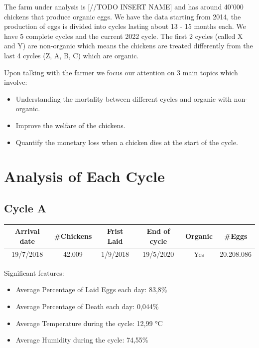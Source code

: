 \documentclass[11pt]{article}
\begin{document}
The farm under analysis is [//TODO INSERT NAME] and has around 40'000 chickens that produce organic eggs. We have the data starting from 2014, the production of eggs is divided into cycles lasting about 13 - 15 months each. We have 5 complete cycles and the current 2022 cycle. The first 2 cycles (called X and Y) are non-organic which means the chickens are treated differently from the last 4 cycles (Z, A, B, C) which are organic.

Upon talking with the farmer we focus our attention on 3 main topics which involve:
\begin{itemize}
    \item Understanding the mortality between different cycles and organic with non-organic.
    \item Improve the welfare of the chickens.
    \item Quantify the monetary loss when a chicken dies at the start of the cycle.
\end{itemize}

\section{Analysis of Each Cycle}
\subsection{Cycle A}
\begin{center}
    \begin{tabular}{|c | c | c | c | c | c|} 
        \hline
        \textbf{Arrival date} & \textbf{\#Chickens} & \textbf{Frist Laid} & \textbf{End of cycle} & \textbf{Organic} & \textbf{\#Eggs}\\ [0.5ex] 
        \hline
        19/7/2018 & 42.009 & 1/9/2018 & 19/5/2020 & Yes & 20.208.086\\
        \hline
    \end{tabular}
\end{center}
Significant features:
\begin{itemize}
    \item Average Percentage of Laid Eggs each day: 83,8\%
    \item Average Percentage of Death each day: 0,044\%
    \item Average Temperature during the cycle: 12,99 °C
    \item Average Humidity during the cycle: 74,55\%
\end{itemize}
\end{document}
